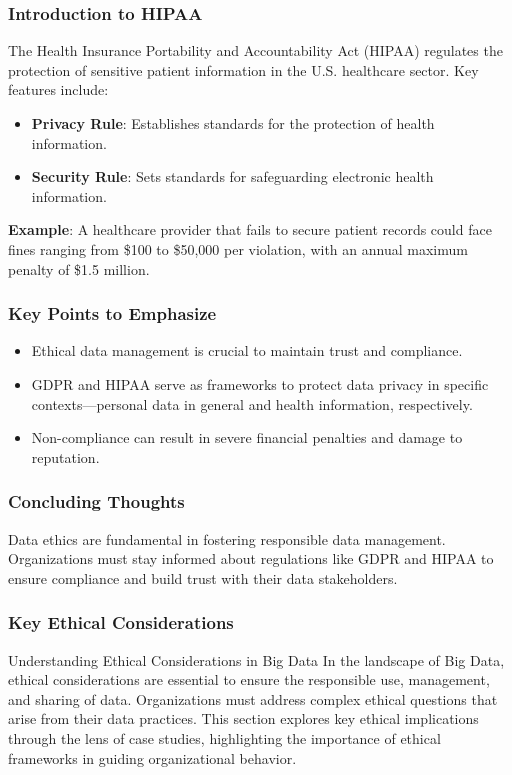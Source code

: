 \documentclass[aspectratio=169]{beamer}
\begin{document}
\begin{frame}[fragile]
    \frametitle{Introduction to HIPAA}
    The Health Insurance Portability and Accountability Act (HIPAA) regulates the protection of sensitive patient information in the U.S. healthcare sector. Key features include:
    \begin{itemize}
        \item \textbf{Privacy Rule}: Establishes standards for the protection of health information.
        \item \textbf{Security Rule}: Sets standards for safeguarding electronic health information.
    \end{itemize}

    \textbf{Example}: A healthcare provider that fails to secure patient records could face fines ranging from \$100 to \$50,000 per violation, with an annual maximum penalty of \$1.5 million.
\end{frame}

\begin{frame}[fragile]
    \frametitle{Key Points to Emphasize}
    \begin{itemize}
        \item Ethical data management is crucial to maintain trust and compliance.
        \item GDPR and HIPAA serve as frameworks to protect data privacy in specific contexts—personal data in general and health information, respectively.
        \item Non-compliance can result in severe financial penalties and damage to reputation.
    \end{itemize}
\end{frame}

\begin{frame}[fragile]
    \frametitle{Concluding Thoughts}
    Data ethics are fundamental in fostering responsible data management. Organizations must stay informed about regulations like GDPR and HIPAA to ensure compliance and build trust with their data stakeholders.
\end{frame}

\begin{frame}[fragile]
    \frametitle{Key Ethical Considerations}
    \begin{block}{Understanding Ethical Considerations in Big Data}
        In the landscape of Big Data, ethical considerations are essential to ensure the responsible use, management, and sharing of data. Organizations must address complex ethical questions that arise from their data practices. This section explores key ethical implications through the lens of case studies, highlighting the importance of ethical frameworks in guiding organizational behavior.
    \end{block}
\end{frame}
\end{document}
